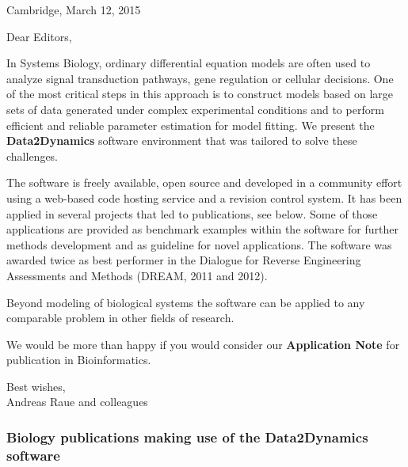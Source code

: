 \documentclass[12pt,a4paper]{scrartcl}
\begin{document}
\pagestyle{empty}

\quad
\vspace{1cm}

\begin{flushright}
Cambridge, March 12, 2015
\end{flushright}

\noindent Dear Editors,

\noindent In Systems Biology, ordinary differential equation models are often used to analyze signal transduction pathways, gene regulation or cellular decisions. One of the most critical steps in this approach is to construct models based on large sets of data generated under complex experimental conditions and to perform efficient and reliable parameter estimation for model fitting. We present the \textbf{Data2Dynamics} software environment that was tailored to solve these challenges.

\noindent The software is freely available, open source and developed in a community effort using a web-based code hosting service and a revision control system. It has been applied in several projects that led to publications, see below. Some of those applications are provided as benchmark examples within the software for further methods development and as guideline for novel applications. The software was awarded twice as best performer in the Dialogue for Reverse Engineering Assessments and Methods (DREAM, 2011 and 2012). 

\noindent Beyond modeling of biological systems the software can be applied to any comparable problem in other fields of research.

\noindent We would be more than happy if you would consider our \textbf{Application Note} for publication in Bioinformatics.

\noindent Best wishes,\\
Andreas Raue and colleagues
\vspace{1cm}



\subsubsection*{Biology publications making use of the Data2Dynamics software}
\end{document}
